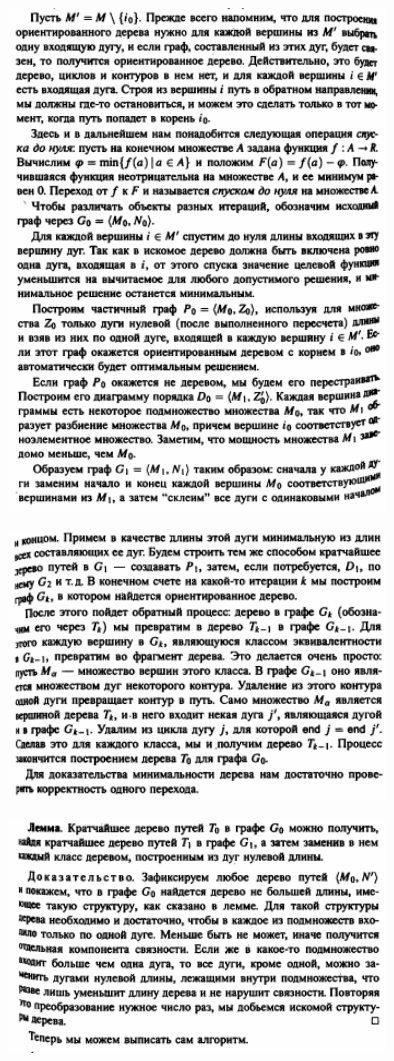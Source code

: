 \documentclass[discrete.tex]{subfiles}
\begin{document}
  \begin{Alg} \
    \begin{figure}[H]
            \includegraphics[width=10cm]{pics/47_2}
            \centering
    \end{figure}
    \begin{figure}[H]
            \includegraphics[width=10cm]{pics/47_3}
            \centering
    \end{figure}
  \end{Alg}

  \begin{figure}[H]
          \includegraphics[width=10cm]{pics/47_4}
          \centering
  \end{figure}
\end{document}
